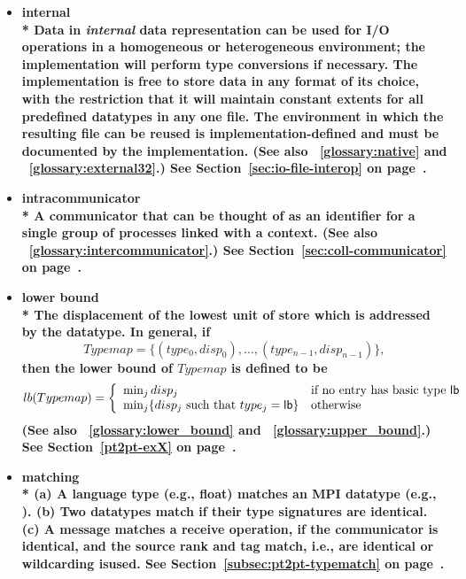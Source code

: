 \begin{itemize}
\label{glossary:internal}
\item \bf{ internal} \\* 
Data in \emph{internal} data representation can be used for I/O operations in a homogeneous or
heterogeneous environment; the implementation will perform type
conversions if necessary. The implementation is free to store data in
any format of its choice,
with the restriction that it will maintain constant extents
for all predefined datatypes in any one file.
The environment in which the resulting file 
can be reused is implementation-defined
and must be documented by the implementation.
(See also ~\ref{glossary:native} and ~\ref{glossary:external32}.)
See Section~\ref{sec:io-file-interop} on page~\pageref{sec:io-file-interop}.

\label{glossary:intracommunicator}
\item \bf{ intracommunicator} \\*
A communicator that can be thought of as an identifier for a single group of processes
linked with a context.   (See also ~\ref{glossary:intercommunicator}.)
See Section~\ref{sec:coll-communicator} on page~\pageref{sec:coll-communicator}.

\label{glossary:lower_bound}
\item \bf{ lower bound} \\*
The displacement of the lowest unit of store which is addressed by the datatype. 
In general, if
\begin{displaymath}
Typemap = \{ (type_0 , disp_0 ) , ... , (type_{n-1} , disp_{n-1}) \} ,
\end{displaymath}
then the {\bf lower bound} of $Typemap$ is defined to be
\[
lb(Typemap) = \left\{ \begin{array}{ll}
\min_j disp_j & \mbox{if no entry has basic type {\sf lb}} \\
\min_j \{ disp_j \ \mbox{such that}\ type_j = {\sf lb} \} & \mbox{otherwise}
\end{array}
\right. \]
(See also ~\ref{glossary:lower_bound} and ~\ref{glossary:upper_bound}.)
See Section~\ref{pt2pt-exX} on page~\pageref{pt2pt-exX}.

\label{glossary:matching}
\item \bf{ matching} \\*
(a) A language type (e.g., float) matches an MPI datatype (e.g., ). 
(b) Two datatypes match if their type signatures are identical.
(c) A message matches a receive operation, if the communicator is identical, and the source rank and tag match, i.e., are identical or wildcarding isused.
 See Section~\ref{subsec:pt2pt-typematch} on page~\pageref{subsec:pt2pt-typematch}.


\end{itemize}

